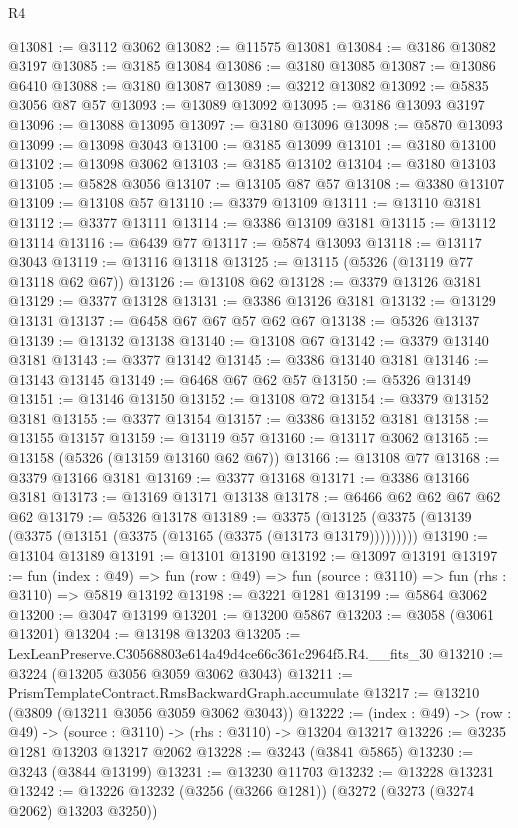 \begin{lexlean}{R4}
\begin{coremodule}
@13081 := @3112 @3062
@13082 := @11575 @13081
@13084 := @3186 @13082 @3197
@13085 := @3185 @13084
@13086 := @3180 @13085
@13087 := @13086 @6410
@13088 := @3180 @13087
@13089 := @3212 @13082
@13092 := @5835 @3056 @87 @57
@13093 := @13089 @13092
@13095 := @3186 @13093 @3197
@13096 := @13088 @13095
@13097 := @3180 @13096
@13098 := @5870 @13093
@13099 := @13098 @3043
@13100 := @3185 @13099
@13101 := @3180 @13100
@13102 := @13098 @3062
@13103 := @3185 @13102
@13104 := @3180 @13103
@13105 := @5828 @3056
@13107 := @13105 @87 @57
@13108 := @3380 @13107
@13109 := @13108 @57
@13110 := @3379 @13109
@13111 := @13110 @3181
@13112 := @3377 @13111
@13114 := @3386 @13109 @3181
@13115 := @13112 @13114
@13116 := @6439 @77
@13117 := @5874 @13093
@13118 := @13117 @3043
@13119 := @13116 @13118
@13125 := @13115 (@5326 (@13119 @77 @13118 @62 @67))
@13126 := @13108 @62
@13128 := @3379 @13126 @3181
@13129 := @3377 @13128
@13131 := @3386 @13126 @3181
@13132 := @13129 @13131
@13137 := @6458 @67 @67 @57 @62 @67
@13138 := @5326 @13137
@13139 := @13132 @13138
@13140 := @13108 @67
@13142 := @3379 @13140 @3181
@13143 := @3377 @13142
@13145 := @3386 @13140 @3181
@13146 := @13143 @13145
@13149 := @6468 @67 @62 @57
@13150 := @5326 @13149
@13151 := @13146 @13150
@13152 := @13108 @72
@13154 := @3379 @13152 @3181
@13155 := @3377 @13154
@13157 := @3386 @13152 @3181
@13158 := @13155 @13157
@13159 := @13119 @57
@13160 := @13117 @3062
@13165 := @13158 (@5326 (@13159 @13160 @62 @67))
@13166 := @13108 @77
@13168 := @3379 @13166 @3181
@13169 := @3377 @13168
@13171 := @3386 @13166 @3181
@13173 := @13169 @13171 @13138
@13178 := @6466 @62 @62 @67 @62 @62
@13179 := @5326 @13178
@13189 := @3375 (@13125 (@3375 (@13139 (@3375 (@13151 (@3375 (@13165 (@3375 (@13173 @13179)))))))))
@13190 := @13104 @13189
@13191 := @13101 @13190
@13192 := @13097 @13191
@13197 := fun (index : @49) =>
  fun (row : @49) => fun (source : @3110) => fun (rhs : @3110) => @5819 @13192
@13198 := @3221 @1281
@13199 := @5864 @3062
@13200 := @3047 @13199
@13201 := @13200 @5867
@13203 := @3058 (@3061 @13201)
@13204 := @13198 @13203
@13205 := LexLeanPreserve.C30568803e614a49d4ce66c361c2964f5.R4.__fits_30
@13210 := @3224 (@13205 @3056 @3059 @3062 @3043)
@13211 := PrismTemplateContract.RmsBackwardGraph.accumulate
@13217 := @13210 (@3809 (@13211 @3056 @3059 @3062 @3043))
@13222 := (index : @49) -> (row : @49) -> (source : @3110) -> (rhs : @3110) -> @13204 @13217
@13226 := @3235 @1281 @13203 @13217 @2062
@13228 := @3243 (@3841 @5865)
@13230 := @3243 (@3844 @13199)
@13231 := @13230 @11703
@13232 := @13228 @13231
@13242 := @13226 @13232 (@3256 (@3266 @1281)) (@3272 (@3273 (@3274 @2062) @13203 @3250))

\end{coremodule}
\end{lexlean}
